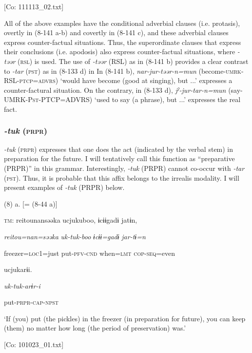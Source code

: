       [Co: 111113\_02.txt]

All of the above examples have the conditional adverbial clauses (i.e. protasis), overtly in (8-141 a-b) and covertly in (8-141 c), and these adverbial clauses express counter-factual situations. Thus, the superordinate clauses that express their conclusions (i.e. apodosis) also express counter-factual situations, where \textit{{}-təər} (\textsc{rsl}) is used. The use of \textit{{}-təər} (RSL) as in (8-141 b) provides a clear contrast to \textit{{}-tar} (\textsc{pst}) as in (8-133 d) in  In (8-141 b), \textit{nar-jur-təər-n=mun} (become-\textsc{umrk}-RSL-\textsc{ptcp}=\textsc{advrs}) ‘would have become (good at singing), but ...’ expresses a counter-factural situation. On the contrary, in (8-133 d), \textit{jˀ-jur-tar-n=mun} (say-UMRK-P\textsc{st}-PTCP=ADVRS) ‘used to say (a phrase), but ...’ expresses the real fact.

\subsubsection{\textit{{}-tuk} (\textsc{prpr})}

\textit{{}-tuk} (\textsc{prpr}) expresses that one does the act (indicated by the verbal stem) in preparation for the future. I will tentatively call this function as “preparative (PRPR)” in this grammar. Interestingly, \textit{{}-tuk} (PRPR) cannot co-occur with \textit{{}-tar} (\textsc{pst}). Thus, it is probable that this affix belongs to the irrealis modality. I will present examples of \textit{{}-tuk} (PRPR) below.

(8)  a.  [= (8-44 a)]

    \textsc{tm}:  {\textbar}reitou{\textbar}nansəəka  ucjukuboo,  ɨcɨɨgadɨ  jatɨn,

      \textit{reitou=nan=səəka}  \textit{uk-tuk-boo}  \textit{ɨcɨɨ=gadɨ}  \textit{jar-tɨ=n}

      freezer=\textsc{loc}1=just  put-\textsc{pfv}-\textsc{cnd}  when=\textsc{lmt}  \textsc{cop}-\textsc{seq}=even

      ucjukarɨi.

      \textit{uk-tuk{}-arɨr-i}

      put-\textsc{prpr}-\textsc{cap}-\textsc{npst}

      ‘If (you) put (the pickles) in the freezer (in preparation for future), you can keep (them) no matter how long (the period of preservation) was.’

      [Co: 101023\_01.txt]

